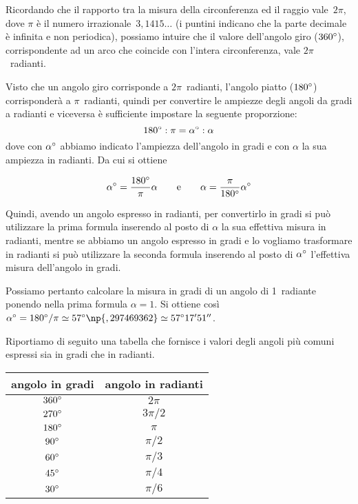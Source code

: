 Ricordando che il rapporto tra la misura della circonferenza ed il raggio vale~$2\pi$, dove $\pi$ è il numero irrazionale~$3,1415\ldots{}$ (i puntini indicano che la parte decimale è infinita e non periodica), possiamo intuire che il valore dell'angolo giro ($360{}^{\circ}$), corrispondente ad un arco che coincide con l'intera circonferenza, vale $2\pi$~radianti.

Visto che un angolo giro corrisponde a $2\pi$~radianti, l'angolo piatto ($180{}^{\circ}$) corrisponderà a $\pi$~radianti, quindi per convertire le ampiezze degli angoli da gradi a radianti e viceversa è sufficiente impostare la seguente proporzione:
\[180{}^{\circ} : \pi = \alpha{}^{\circ} : \alpha\]
dove con $\alpha{}^{\circ}$ abbiamo indicato l'ampiezza dell'angolo in gradi e con $\alpha$ la sua ampiezza in radianti. Da cui si ottiene

\[\alpha{}^{\circ} = \dfrac{180{}^{\circ}}{\pi}\alpha\qquad\text{e}\qquad\alpha = \dfrac{\pi}{180{}^{\circ}}\alpha{}^{\circ}\]

Quindi, avendo un angolo espresso in radianti, per convertirlo in gradi si può utilizzare la prima formula inserendo al posto di $\alpha$ la sua effettiva misura in radianti, mentre se abbiamo un angolo espresso in gradi e lo vogliamo trasformare in radianti si può utilizzare la seconda formula inserendo al posto di $\alpha{}^{\circ}$ l'effettiva misura dell'angolo in gradi.

Possiamo pertanto calcolare la misura in gradi di un angolo di 1~radiante ponendo nella prima formula $\alpha=1$. Si ottiene così $\alpha\grado = 180\grado/\pi \simeq 57\grado\np{,297469362} \simeq 57\grado 17'51''$.

Riportiamo di seguito una tabella che fornisce i valori degli angoli più comuni espressi sia in gradi che in radianti.

\begin{center}
\begin{tabular}{cc}
\toprule
angolo in gradi	& angolo in radianti\\
\midrule
$360{}^{\circ}$ & $2\pi$\\
$270{}^{\circ}$ & $3\pi/2$\\
$180{}^{\circ}$ & $\pi$\\
$90{}^{\circ}$ & $\pi/2$\\
$60{}^{\circ}$ & $\pi/3$\\
$45{}^{\circ}$ & $\pi/4$\\
$30{}^{\circ}$ & $\pi/6$\\
\bottomrule
\end{tabular}
\end{center}


